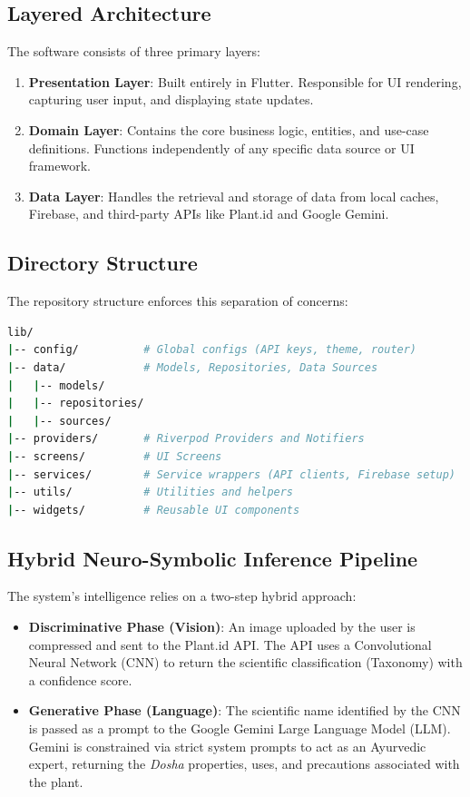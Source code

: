 \documentclass[12pt, a4paper]{report}
\begin{document}
\subsection{Layered Architecture}
The software consists of three primary layers:
\begin{enumerate}
    \item \textbf{Presentation Layer}: Built entirely in Flutter. Responsible for UI rendering, capturing user input, and displaying state updates.
    \item \textbf{Domain Layer}: Contains the core business logic, entities, and use-case definitions. Functions independently of any specific data source or UI framework.
    \item \textbf{Data Layer}: Handles the retrieval and storage of data from local caches, Firebase, and third-party APIs like Plant.id and Google Gemini.
\end{enumerate}

\subsection{Directory Structure}
The repository structure enforces this separation of concerns:
\begin{lstlisting}[language=bash]
lib/
|-- config/          # Global configs (API keys, theme, router)
|-- data/            # Models, Repositories, Data Sources
|   |-- models/
|   |-- repositories/
|   |-- sources/
|-- providers/       # Riverpod Providers and Notifiers
|-- screens/         # UI Screens
|-- services/        # Service wrappers (API clients, Firebase setup)
|-- utils/           # Utilities and helpers
|-- widgets/         # Reusable UI components
\end{lstlisting}

\subsection{Hybrid Neuro-Symbolic Inference Pipeline}
The system's intelligence relies on a two-step hybrid approach:
\begin{itemize}
    \item \textbf{Discriminative Phase (Vision)}: An image uploaded by the user is compressed and sent to the Plant.id API. The API uses a Convolutional Neural Network (CNN) to return the scientific classification (Taxonomy) with a confidence score.
    \item \textbf{Generative Phase (Language)}: The scientific name identified by the CNN is passed as a prompt to the Google Gemini Large Language Model (LLM). Gemini is constrained via strict system prompts to act as an Ayurvedic expert, returning the \textit{Dosha} properties, uses, and precautions associated with the plant.
\end{itemize}
\end{document}

